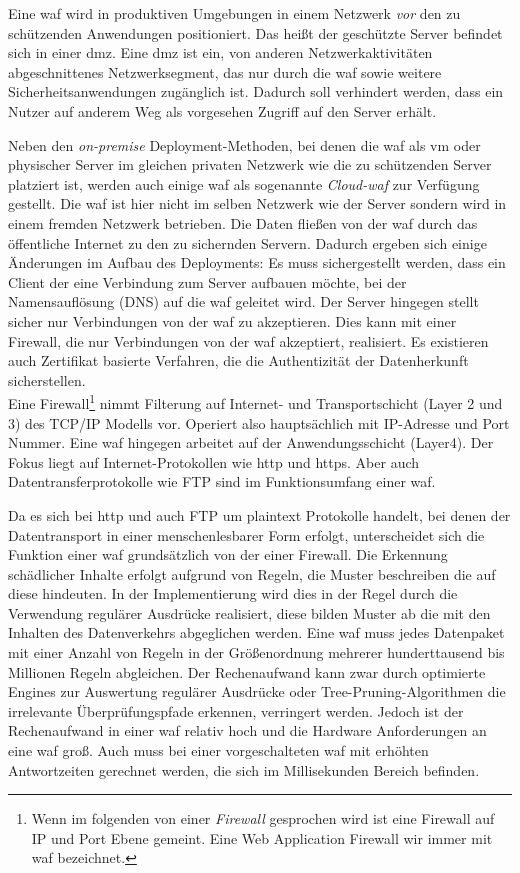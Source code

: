 Eine \ac{waf} wird in produktiven Umgebungen in einem Netzwerk \textit{vor} den zu schützenden Anwendungen positioniert.
Das heißt der geschützte Server befindet sich in einer \ac{dmz}.
Eine \ac{dmz} ist ein, von anderen Netzwerkaktivitäten abgeschnittenes Netzwerksegment, das nur durch die \ac{waf} sowie weitere Sicherheitsanwendungen zugänglich ist.
Dadurch soll verhindert werden, dass ein Nutzer auf anderem Weg als vorgesehen Zugriff auf den Server erhält.

Neben den \textit{on-premise} Deployment-Methoden, bei denen die \ac{waf} als \ac{vm} oder physischer Server im gleichen privaten Netzwerk wie die zu schützenden Server platziert ist, werden auch einige \ac{waf} als sogenannte \textit{Cloud-\ac{waf}} zur Verfügung gestellt.
Die \ac{waf} ist hier nicht im selben Netzwerk wie der Server sondern wird in einem fremden Netzwerk betrieben.
Die Daten fließen von der \ac{waf} durch das öffentliche Internet zu den zu sichernden Servern.
Dadurch ergeben sich einige Änderungen im Aufbau des Deployments:
Es muss sichergestellt werden, dass ein Client der eine Verbindung zum Server aufbauen möchte, bei der Namensauflösung (DNS) auf die \ac{waf} geleitet wird.
Der Server hingegen stellt sicher nur Verbindungen von der \ac{waf} zu akzeptieren.
Dies kann mit einer Firewall, die nur Verbindungen von der \ac{waf} akzeptiert, realisiert.
Es existieren auch Zertifikat basierte Verfahren, die die Authentizität der Datenherkunft sicherstellen.\\


Eine Firewall\footnote{Wenn im folgenden von einer \textit{Firewall} gesprochen wird ist eine Firewall auf IP und Port Ebene gemeint. Eine Web Application Firewall wir immer mit \ac{waf} bezeichnet.} nimmt Filterung auf Internet- und Transportschicht (Layer 2 und 3) des TCP/IP Modells vor.
Operiert also hauptsächlich mit IP-Adresse und Port Nummer.
Eine \ac{waf} hingegen arbeitet auf der Anwendungsschicht (Layer4).
Der Fokus liegt auf Internet-Protokollen wie \ac{http} und \ac{https}. 
Aber auch Datentransferprotokolle wie FTP sind im Funktionsumfang einer \ac{waf}.

Da es sich bei \ac{http} und auch FTP um plaintext Protokolle handelt, bei denen der Datentransport in einer menschenlesbarer Form erfolgt, unterscheidet sich die Funktion einer \ac{waf} grundsätzlich von der einer Firewall.
Die Erkennung schädlicher Inhalte erfolgt aufgrund von Regeln, die Muster beschreiben die auf diese hindeuten.
In der Implementierung wird dies in der Regel durch die Verwendung regulärer Ausdrücke realisiert, diese bilden Muster ab die mit den Inhalten des Datenverkehrs abgeglichen werden.
Eine \ac{waf} muss jedes Datenpaket mit einer Anzahl von Regeln in der Größenordnung mehrerer hunderttausend bis Millionen Regeln abgleichen.
Der Rechenaufwand kann zwar durch optimierte Engines zur Auswertung regulärer Ausdrücke oder Tree-Pruning-Algorithmen die irrelevante Überprüfungspfade erkennen, verringert werden.
Jedoch ist der Rechenaufwand in einer \ac{waf} relativ hoch und die Hardware Anforderungen an eine \ac{waf} groß.
Auch muss bei einer vorgeschalteten \ac{waf} mit erhöhten Antwortzeiten gerechnet werden, die sich im Millisekunden Bereich befinden.

